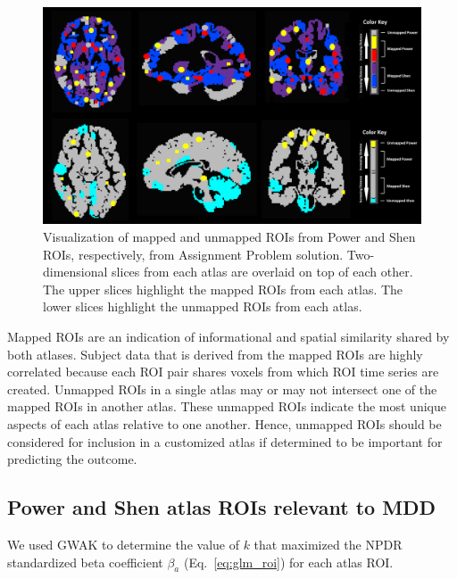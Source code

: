 \documentclass[10pt,letterpaper]{article}\usepackage[]{graphicx}\usepackage[]{color}
\begin{document}
\begin{figure}[h!]
	\centering
	\includegraphics[width=1\textwidth,clip,trim=0cm 0cm 0cm 0.0cm]{mapped-unmapped-montage.png}
	\caption{Visualization of mapped and unmapped ROIs from Power and Shen ROIs, respectively, from Assignment Problem solution. Two-dimensional slices from each atlas are overlaid on top of each other. The upper slices highlight the mapped ROIs from each atlas. The lower slices highlight the unmapped ROIs from each atlas.}\label{fig:power_shen_mapped-unmapped}
\end{figure}

Mapped ROIs are an indication of informational and spatial similarity shared by both atlases. Subject data that is derived from the mapped ROIs are highly correlated because each ROI pair shares voxels from which ROI time series are created. Unmapped ROIs in a single atlas may or may not intersect one of the mapped ROIs in another atlas. These unmapped ROIs indicate the most unique aspects of each atlas relative to one another. Hence, unmapped ROIs should be considered for inclusion in a customized atlas if determined to be important for predicting the outcome.

\subsection{Power and Shen atlas ROIs relevant to MDD}
We used GWAK to determine the value of $k$ that maximized the NPDR standardized beta coefficient $\beta_a$ (Eq.~\ref{eq:glm_roi}) for each atlas ROI. 
\end{document}
